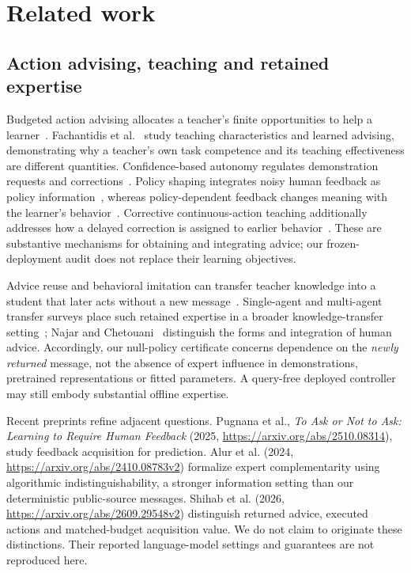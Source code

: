 \section{Related work}\label{sec:related}
\subsection{Action advising, teaching and retained expertise}
Budgeted action advising allocates a teacher's finite opportunities to help a learner~\cite{torrey}. Fachantidis et al.~\cite{fachantidis} study teaching characteristics and learned advising, demonstrating why a teacher's own task competence and its teaching effectiveness are different quantities. Confidence-based autonomy regulates demonstration requests and corrections~\cite{chernova}. Policy shaping integrates noisy human feedback as policy information~\cite{griffith}, whereas policy-dependent feedback changes meaning with the learner's behavior~\cite{macglashan}. Corrective continuous-action teaching additionally addresses how a delayed correction is assigned to earlier behavior~\cite{celemin}. These are substantive mechanisms for obtaining and integrating advice; our frozen-deployment audit does not replace their learning objectives.

Advice reuse and behavioral imitation can transfer teacher knowledge into a student that later acts without a new message~\cite{zhu,ilhan}. Single-agent and multi-agent transfer surveys place such retained expertise in a broader knowledge-transfer setting~\cite{taylor,silva}; Najar and Chetouani~\cite{najar} distinguish the forms and integration of human advice. Accordingly, our null-policy certificate concerns dependence on the \emph{newly returned} message, not the absence of expert influence in demonstrations, pretrained representations or fitted parameters. A query-free deployed controller may still embody substantial offline expertise.

Recent preprints refine adjacent questions. Pugnana et al., \emph{To Ask or Not to Ask: Learning to Require Human Feedback} (2025, \url{https://arxiv.org/abs/2510.08314}), study feedback acquisition for prediction. Alur et al. (2024, \url{https://arxiv.org/abs/2410.08783v2}) formalize expert complementarity using algorithmic indistinguishability, a stronger information setting than our deterministic public-source messages. Shihab et al. (2026, \url{https://arxiv.org/abs/2609.29548v2}) distinguish returned advice, executed actions and matched-budget acquisition value. We do not claim to originate these distinctions. Their reported language-model settings and guarantees are not reproduced here.

